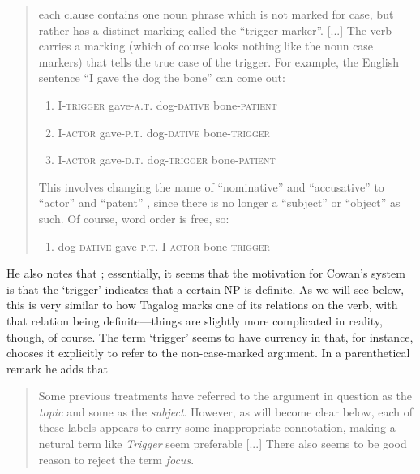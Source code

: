 \blockcquote{cowan1995}{each clause contains one noun phrase which is not
marked for case, but rather has a distinct marking called the \enquote{trigger
marker}. [...] The verb carries a marking (which of course looks nothing like
the noun case markers) that tells the true case of the trigger. For example,
the English sentence \enquote{I gave the dog the bone} can come out:

\begin{enumerate}[nosep, label={\arabic*)}]
\item I-\textsc{trigger} gave-\textsc{a.t.} dog-\textsc{dative}
	bone-\textsc{patient}
\item I-\textsc{actor} gave-\textsc{p.t.} dog-\textsc{dative} 
	bone-\textsc{trigger}
\item I-\textsc{actor} gave-\textsc{d.t.} dog-\textsc{trigger} 
	bone-\textsc{patient}
\end{enumerate}

This involves changing the name of \enquote{nominative} and
\enquote{accusative} to \enquote{actor} and \enquote{patent} \sic{}, since
there is no longer a \enquote{subject} or \enquote{object} as such. Of course,
word order is free, so:

\begin{enumerate}[start=4, nosep, label={\arabic*)}]
\item dog-\textsc{dative} gave-\textsc{p.t.} I-\textsc{actor} 
	bone-\textsc{trigger}
\end{enumerate}
}

He also notes that ; essentially, it seems that the motivation for
Cowan's system is that the `trigger' indicates that a certain NP is definite.
As we will see below, this is very similar to how Tagalog marks one of its
relations on the verb, with that relation being definite---things are slightly
more complicated in reality, though, of course. The term `trigger' seems to
have currency in that, for instance, \citet{schachter2015} chooses it
explicitly to refer to the  {non-case-marked
argument}. In a parenthetical remark he adds that

\blockcquote[1659]{schachter2015}{Some previous treatments have referred to the
argument in question as the \emph{topic} and some as the \emph{subject}.
However, as will become clear below, each of these labels appears to carry some
inappropriate connotation, making a netural term like \emph{Trigger} seem
preferable [...] There also seems to be good reason to reject the term
\emph{focus}.}

